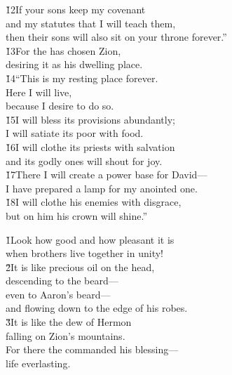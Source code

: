 \begin{poetry}
\poeml \v{12}If your sons keep my covenant \\
\poemll    and my statutes that I will teach them, \\
\poemlll       then their sons will also sit on your throne forever.'' \\
\poeml \v{13}For the  has chosen Zion, \\
\poemll    desiring it as his dwelling place. \\
\poeml \v{14}``This is my resting place forever. \\
\poemll    Here I will live, \\
\poemlll       because I desire to do so. \\
\poeml \v{15}I will bless its provisions abundantly; \\
\poemll    I will satiate its poor with food. \\
\poeml \v{16}I will clothe its priests with salvation \\
\poemll    and its godly ones will shout for joy. \\
\poeml \v{17}There I will create a power base for David--- \\
\poemll    I have prepared a lamp for my anointed one. \\
\poeml \v{18}I will clothe his enemies with disgrace, \\
\poemll    but on him his crown will shine.''
\end{poetry}

\begin{poetry}
\poeml \v{1}Look how good and how pleasant it is \\
\poemll    when brothers live together in unity! \\
\poeml \v{2}It is like precious oil on the head, \\
\poemll    descending to the beard--- \\
\poeml even to Aaron's beard--- \\
\poemll    and flowing down to the edge of his robes. \\
\poeml \v{3}It is like the dew of Hermon \\
\poemll    falling on Zion's mountains. \\
\poeml For there the  commanded his blessing--- \\
\poemll    life everlasting.
\end{poetry}

